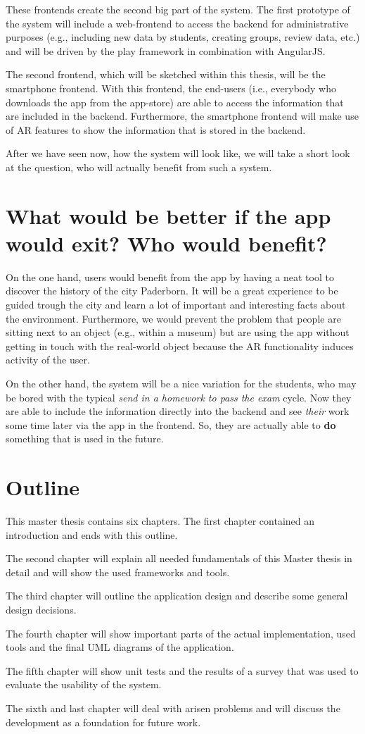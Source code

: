 These frontends create the second big part of the system. The first prototype of the system will include a web-frontend to access the backend for administrative purposes (e.g., including new data by students, creating groups, review data, etc.) and will be driven by the play framework in combination with AngularJS. 

The second frontend, which will be sketched within this thesis, will be the smartphone frontend. With this frontend, the end-users (i.e., everybody who downloads the app from the app-store) are able to access the information that are included in the backend. Furthermore, the smartphone frontend will make use of \ac{AR} features to show the information that is stored in the backend. 

After we have seen now, how the system will look like, we will take a short look at the question, who will actually benefit from such a system.   

\section{What would be better if the app would exit? Who would benefit?}
On the one hand, users would benefit from the app by having a neat tool to discover the history of the city Paderborn. It will be a great experience to be guided trough the city and learn a lot of important and interesting facts about the environment. Furthermore, we would prevent the problem that people are sitting next to an object (e.g., within a museum) but are using the app without getting in touch with the real-world object because the \ac{AR} functionality induces activity of the user.  

On the other hand, the system will be a nice variation for the students, who may be bored with the typical \textit{send in a homework to pass the exam} cycle. Now they are able to include the information directly into the backend and see \textit{their} work some time later via the app in the frontend. So, they are actually able to \textbf{do} something that is used in the future.    

\section{Outline}
This master thesis contains six chapters. The first chapter contained an introduction and ends with this outline.

The second chapter will explain all needed fundamentals of this Master thesis in detail and will show the used frameworks and tools.

The third chapter will outline the application design and describe some general design decisions.

The fourth chapter will show important parts of the actual implementation, used tools and the final \acf{UML} diagrams of the application.

The fifth chapter will show unit tests and the results of a survey that was used to evaluate the usability of the system. 

The sixth and last chapter will deal with arisen problems and will discuss the development as a foundation for future work.
